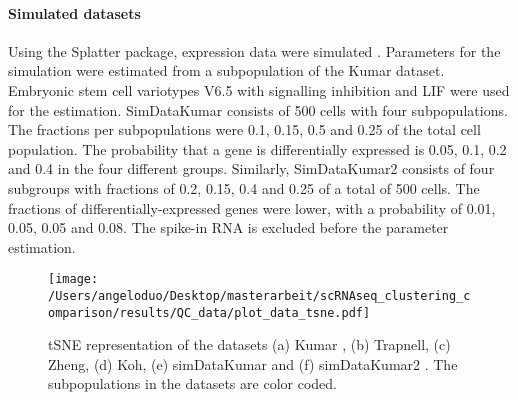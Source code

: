 \documentclass[12pt, a4paper]{article}\usepackage[]{graphicx}\usepackage[]{color}
\begin{document}
\paragraph{Simulated datasets }
Using the Splatter package, expression data were simulated \citep{oshlack2017splatter}. Parameters for the simulation were estimated from a subpopulation of the Kumar dataset.  Embryonic stem cell variotypes V6.5 with signalling inhibition and LIF were used for the estimation. SimDataKumar consists of 500 cells with four subpopulations. The fractions per subpopulations were 0.1, 0.15, 0.5 and 0.25 of the total cell population. The probability that a gene is differentially expressed is 0.05, 0.1, 0.2 and 0.4 in the four different groups. Similarly, SimDataKumar2 consists of four subgroups with fractions of 0.2, 0.15, 0.4 and 0.25 of a total of 500 cells. The fractions of differentially-expressed genes were lower, with a probability of 0.01, 0.05, 0.05 and 0.08. The spike-in RNA is excluded before the parameter estimation.
\begin{figure}[!h]
\begin{center}
\texttt{[image: /Users/angeloduo/Desktop/masterarbeit/scRNAseq\_clustering\_comparison/results/QC\_data/plot\_data\_tsne.pdf]}
\caption{tSNE representation of the datasets (a) Kumar , (b) Trapnell, (c) Zheng, (d) Koh, (e) simDataKumar and (f) simDataKumar2 . The subpopulations in the datasets are color coded.  }
\label{fig:datatsne}
\end{center}
\end{figure}
\end{document}
